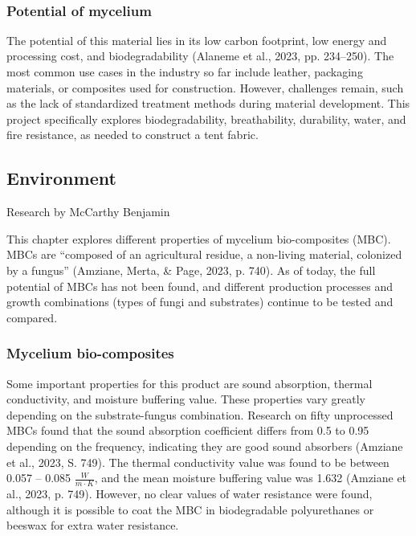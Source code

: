\documentclass{article}
\begin{document}
\\


\subsubsection{Potential of mycelium}
The potential of this material lies in its low carbon footprint, low
energy and processing cost, and biodegradability
(Alaneme et al., 2023, pp. 234--250). The most common use cases in the
industry so far include leather, packaging materials, or composites
used for construction. However, challenges remain, such as the lack
of standardized treatment methods during material development. This
project specifically explores biodegradability, breathability,
durability, water, and fire resistance, as needed to construct a tent
fabric.\\


\subsection{Environment}
{\small Research by McCarthy Benjamin}

This chapter explores different properties of mycelium bio-composites
(MBC). MBCs are ``composed of an agricultural residue, a non-living
material, colonized by a fungus'' (Amziane, Merta, \& Page, 2023, p. 740).
As of today, the full potential of MBCs has not been found, and
different production processes and growth combinations
(types of fungi and substrates) continue to be tested and compared.

\subsubsection{Mycelium bio-composites}

Some important properties for this product are sound absorption,
thermal conductivity, and moisture buffering value. These properties
vary greatly depending on the substrate-fungus combination. Research
on fifty unprocessed MBCs found that the sound absorption coefficient
differs from 0.5 to 0.95 depending on the frequency, indicating they
are good sound absorbers (Amziane et al., 2023, S. 749). The thermal
conductivity value was found to be between 0.057 -- 0.085
$\frac{W}{m\cdot K}$, and the mean moisture buffering value was
1.632 (Amziane et al., 2023, p. 749). However, no clear values of
water resistance were found, although it is possible to coat the MBC
in biodegradable polyurethanes or beeswax for extra water resistance.\\
\end{document}

